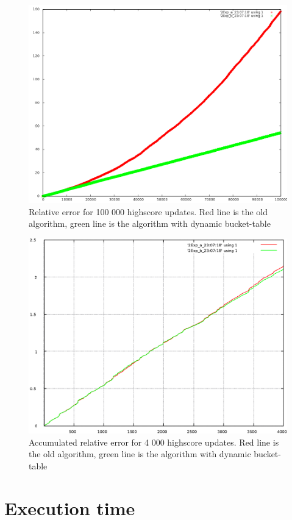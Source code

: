 \begin{figure}[h!]
  \centering
  \caption{Relative error for 100 000 highscore updates. Red line is the old algorithm, green line is the algorithm with dynamic bucket-table}
  \label{fig:relerror}
  \includegraphics[width=12cm]{img/relative}
\end{figure}

\begin{figure}[h!]
  \centering
  \caption{Accumulated relative error for 4 000 highscore updates. Red line is the old algorithm, green line is the algorithm with dynamic bucket-table}
  \label{fig:relerror4000}
  \includegraphics[width=12cm]{img/acc-rel-error}
\end{figure}

\section{Execution time}

